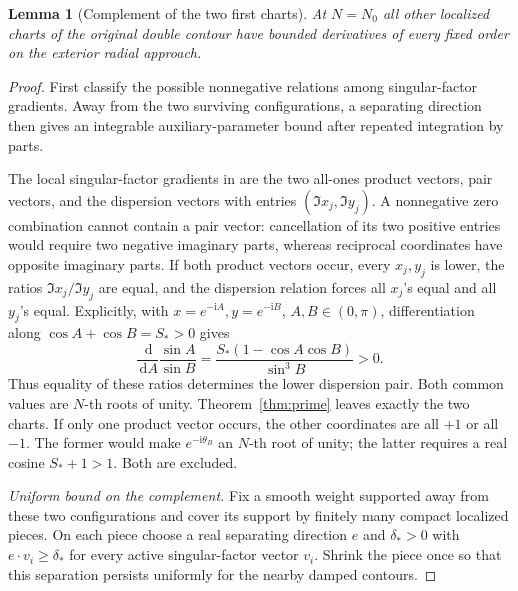 \documentclass[11pt]{article}
\numberwithin{equation}{section}
\newtheorem{lemma}[theorem]{Lemma}
\theoremstyle{definition}
\newcommand{\dd}{\,\mathrm d}
\newcommand{\ii}{\mathrm i}
\begin{document}
\begin{lemma}[Complement of the two first charts]\label{lem:complement}
At \(N=N_0\) all other localized charts of the original double contour
have bounded derivatives of every fixed order on the exterior radial
approach.
\end{lemma}
\begin{proof}
First classify the possible nonnegative relations among singular-factor gradients. Away from the two surviving configurations, a separating direction then gives an integrable auxiliary-parameter bound after repeated integration by parts.

The local singular-factor gradients in \cite{TW2014} are the two
all-ones product vectors, pair vectors, and the dispersion vectors with
entries \((\Im x_j,\Im y_j)\).
A nonnegative zero combination cannot contain a pair vector:
cancellation of its two positive entries would require two negative
imaginary parts, whereas reciprocal coordinates have opposite imaginary
parts. If both product vectors occur, every \(x_j,y_j\) is lower,
the ratios \(\Im x_j/\Im y_j\) are equal, and the dispersion relation
forces all \(x_j\)'s equal and all \(y_j\)'s equal. Explicitly, with
\(x=e^{-\ii A},y=e^{-\ii B}\), \(A,B\in(0,\pi)\), differentiation
along \(\cos A+\cos B=S_*>0\) gives
\[
 \frac{\dd}{\dd A}\frac{\sin A}{\sin B}
 =\frac{S_*(1-\cos A\cos B)}{\sin^3B}>0.
\]
Thus equality of these ratios determines the lower dispersion pair. Both common values are \(N\)-th
roots of unity. Theorem~\ref{thm:prime} leaves exactly the two charts.
If only one product vector occurs, the other coordinates are all \(+1\)
or all \(-1\). The former would make \(e^{-\ii\theta_B}\) an \(N\)-th
root of unity; the latter requires a real cosine \(S_*+1>1\).
Both are excluded.

\smallskip\noindent\textit{Uniform bound on the complement.}
Fix a smooth weight supported away from these two configurations and
cover its support by finitely many compact localized pieces. On each piece choose a real separating direction \(e\) and
\(\delta_*>0\) with \(e\cdot v_i\ge\delta_*\) for every active
singular-factor vector \(v_i\). Shrink the piece once so that this
separation persists uniformly for the nearby damped contours.


\end{proof}
\end{document}
